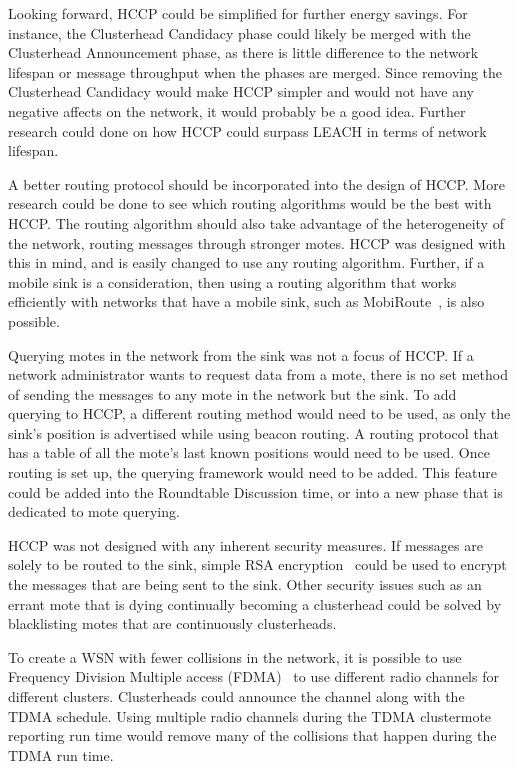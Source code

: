 
Looking forward, HCCP could be simplified for further energy savings. For instance,
the Clusterhead Candidacy phase could likely be merged with the Clusterhead Announcement phase,
as there is little difference to the network lifespan or message throughput when the phases are merged. 
Since removing the
Clusterhead Candidacy would make HCCP simpler and would not 
have any negative affects on the network, it would probably be a good idea. Further
research could done on how HCCP could surpass LEACH in terms of network lifespan.

A better routing protocol should be 
incorporated into the design of HCCP. More research could be done 
to see which routing algorithms would be the best with HCCP. The routing
algorithm should also take advantage of the heterogeneity of the network, routing 
messages through stronger motes.
HCCP was designed with this in mind, and is easily changed to use any routing algorithm. 
Further, if a mobile sink is a consideration, then using a routing algorithm that works efficiently with
networks that have a mobile sink, such as MobiRoute~\cite{mobileSinkRouting}, is also possible.

Querying motes in the network from the sink was not a focus of HCCP. If a network administrator 
wants to request data from a mote, there is no set method of sending the messages to any mote in the network
but the sink. To add querying to HCCP, a different routing method would need to be used, as only the  
sink's position is advertised while using beacon routing. A routing protocol that has a table
of all the mote's last known positions would need to be used. Once routing is set up, the 
querying framework would need to be added. This feature could be added into the 
Roundtable Discussion time, or into a new phase that is dedicated to mote querying.

HCCP was not designed with any inherent security measures. If messages are solely to be routed to the sink, 
simple RSA encryption~\cite{rsa}
could be used to encrypt the messages that are being sent to the sink. Other security issues such as
an errant mote that is dying continually becoming a clusterhead could be solved by blacklisting motes
that are continuously clusterheads.

To create a WSN with fewer collisions in the network,
it is possible to use Frequency Division Multiple access (FDMA)~\cite{fdma} to use
different radio channels for different clusters. 
Clusterheads could announce the channel along with the TDMA schedule. 
Using multiple radio channels during the TDMA clustermote reporting run time would remove many of the collisions
that happen during the TDMA run time.



